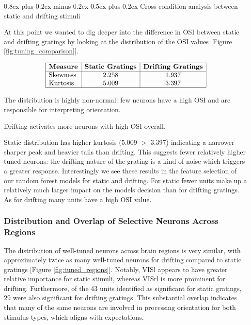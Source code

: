 \documentclass[10pt,twocolumn]{article}
\makeatletter
\renewcommand{\subsection}{\@startsection{subsection}{2}{\z@}%
  {0.8ex plus 0.2ex minus 0.2ex}%
  {0.5ex plus 0.2ex}%
  {\normalfont\normalsize\bfseries}}
\makeatother
\begin{document}
\subsection{Cross condition analysis between static and drifting stimuli}

At this point we wanted to dig deeper into the difference in OSI between static and drifting gratings by looking at the distribution of the OSI values [Figure \ref{fig:tuning_comparison}]. 

\[
\begin{array}{|l|c|c|}
\hline
\textbf{Measure} & \textbf{Static Gratings} & \textbf{Drifting Gratings} \\
\hline
\text{Skewness} & 2.258 & 1.937 \\
\text{Kurtosis} & 5.009 & 3.397 \\
\hline
\end{array}
\]

The distribution is highly non-normal: few neurons have a high OSI and are responsible for interpreting orientation.

Drifting activates more neurons with high OSI overall.

Static distribution has higher kurtosis (5.009 $>$ 3.397) indicating a narrower sharper peak and heavier tails than drifting. This suggests fewer relatively higher tuned neurons: the drifting nature of the grating is a kind of noise which triggers a greater response. Interestingly we see these results in the feature selection of our random forest models for static and drifting. For static fewer units make up a relatively much larger impact on the models decision than for drifting gratings. As for drifting many units have a high OSI value. 

\subsubsection{Distribution and Overlap of Selective Neurons Across Regions}

The distribution of well-tuned neurons across brain regions is very similar, with approximately twice as many well-tuned neurons for drifting compared to static gratings [Figure \ref{fig:tuned_regions}]. Notably, VISl appears to have greater relative importance for static stimuli, whereas VISrl is more prominent for drifting. Furthermore, of the 43 units identified as significant for static gratings, 29 were also significant for drifting gratings. This substantial overlap indicates that many of the same neurons are involved in processing orientation for both stimulus types, which aligns with expectations.
\end{document}
